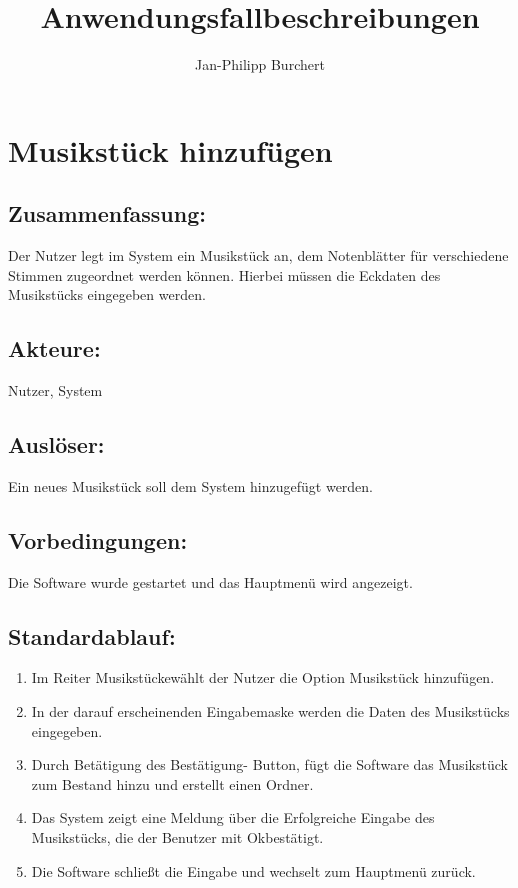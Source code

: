 \documentclass[a4paper,10pt]{scrartcl}
\title{Anwendungsfallbeschreibungen}
\author{Jan-Philipp Burchert}
\date{ }
\begin{document}
\maketitle
 
\tableofcontents
\newpage

\section{Musikstück hinzufügen}
\label{uc musik hinzufuegen}
\subsection{Zusammenfassung:}
Der Nutzer legt im System ein Musikstück an, dem Notenblätter für verschiedene Stimmen zugeordnet werden können. Hierbei müssen die Eckdaten des Musikstücks eingegeben werden.
\subsection{Akteure:} 
Nutzer, System
\subsection{Auslöser:} 
Ein neues Musikstück soll dem System hinzugefügt werden.
\subsection{Vorbedingungen:}
Die Software wurde gestartet und das Hauptmenü wird angezeigt.
\subsection{Standardablauf:}
\begin{enumerate}	
	\item Im Reiter \glqq Musikstücke\grqq wählt der Nutzer die Option \glqq Musikstück hinzufügen\grqq.
	\item In der darauf erscheinenden Eingabemaske werden die Daten des Musikstücks eingegeben.
	\item Durch Betätigung des \glqq Bestätigung\grqq - Button, fügt die Software das Musikstück zum Bestand hinzu und erstellt einen Ordner.
	\item Das System zeigt eine Meldung über die Erfolgreiche Eingabe des Musikstücks, die der Benutzer mit \glqq Ok\grqq bestätigt. \label{Mhzu-Best}
	\item Die Software schließt die Eingabe und wechselt zum Hauptmenü zurück.
\end{enumerate}
\end{document}
